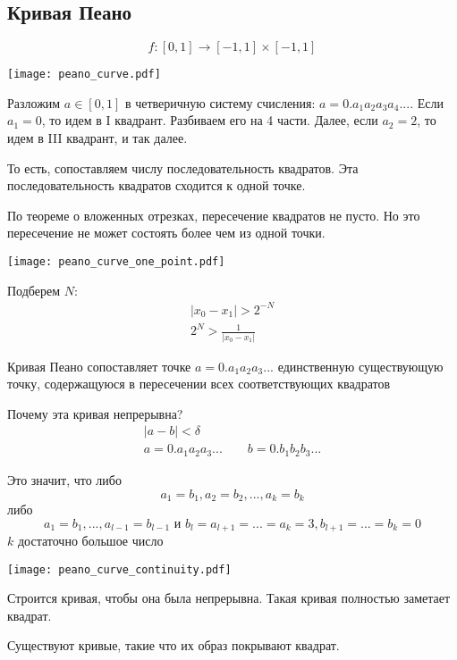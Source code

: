 \documentclass[main]{subfiles}
\begin{document}
\subsection{Кривая Пеано}
\[f:[0,1] \to [-1,1] \times [-1,1]\]
\begin{center}
    \texttt{[image: peano\_curve.pdf]}
\end{center}
Разложим $a \in [0,1]$ в четверичную систему счисления: $a = 0.a_1 a_2 a_3 a_4 ...$.
Если $a_1 = 0$, то идем в I квадрант. Разбиваем его на 4 части.
Далее, если $a_2=2$, то идем в III квадрант, и так далее.

То есть, сопоставляем числу последовательность квадратов.
Эта последовательность квадратов сходится к одной точке.

По теореме о вложенных отрезках, пересечение квадратов не пусто.
Но это пересечение не может состоять более чем из одной точки.

\begin{minipage}{0.45\textwidth}
    \texttt{[image: peano\_curve\_one\_point.pdf]}
\end{minipage}
\begin{minipage}{0.45\textwidth}
    Подберем $N$:
    \begin{gather*}
        |x_0 - x_1| > 2^{-N}\\
        2^N > \frac{1}{|x_0 - x_1|}
    \end{gather*}
\end{minipage}

Кривая Пеано сопоставляет точке $a = 0.a_1 a_2 a_3...$ единственную
существующую точку, содержащуюся в пересечении всех соответствующих квадратов

Почему эта кривая непрерывна?
\begin{gather*}
    |a-b|<\delta\\
    a = 0. a_1 a_2 a_3 ... \qquad b = 0. b_1 b_2 b_3 ...
\end{gather*}

Это значит, что либо
\[a_1 = b_1, a_2 = b_2, ..., a_k = b_k\]
либо
\[a_1 = b_1,..., a_{l-1} = b_{l-1} \text{ и } b_l= a_{l+1} = ... = a_k =3,  b_{l+1} = ... = b_k =0\]
$k$ достаточно большое число
\begin{center}
    \texttt{[image: peano\_curve\_continuity.pdf]}
\end{center}

Строится кривая, чтобы она была непрерывна. Такая кривая полностью заметает квадрат.

Существуют кривые, такие что их образ покрывают квадрат.
\end{document}
